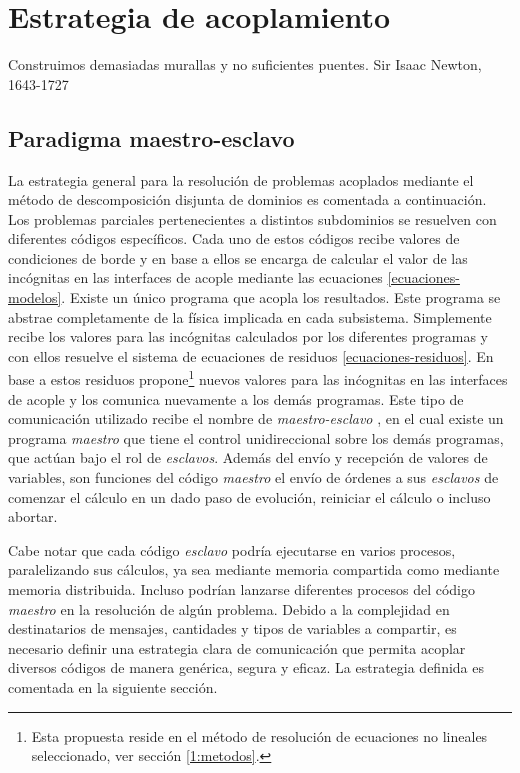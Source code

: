 \chapter{Estrategia de acoplamiento}
\label{chap2}
\chapterquote
{Construimos demasiadas murallas y no suficientes puentes.}
{Sir Isaac Newton, 1643-1727}

\section{Paradigma maestro-esclavo}
\label{2:maestro-esclavo}
La estrategia general para la resolución de problemas acoplados mediante el método de descomposición disjunta de dominios es comentada a continuación.
Los problemas parciales pertenecientes a distintos subdominios se resuelven con diferentes códigos específicos.
Cada uno de estos códigos recibe valores de condiciones de borde y en base a ellos se encarga de calcular el valor de las incógnitas en las interfaces de acople mediante las ecuaciones \ref{ecuaciones-modelos}.
Existe un único programa que acopla los resultados.
Este programa se abstrae completamente de la física implicada en cada subsistema.
Simplemente recibe los valores para las incógnitas calculados por los diferentes programas y con ellos resuelve el sistema de ecuaciones de residuos \ref{ecuaciones-residuos}.
En base a estos residuos propone\footnote{
Esta propuesta reside en el método de resolución de ecuaciones no lineales seleccionado, ver sección \ref{1:metodos}.
} nuevos valores para las inćognitas en las interfaces de acople y los comunica nuevamente a los demás programas.
Este tipo de comunicación utilizado recibe el nombre de \textit{maestro-esclavo} \cite{maestro-esclavo},
en el cual existe un programa \textit{maestro} que tiene el control unidireccional sobre los demás programas, que actúan bajo el rol de \textit{esclavos}.
Además del envío y recepción de valores de variables, son funciones del código \textit{maestro} el envío de órdenes a sus \textit{esclavos} de comenzar el cálculo en un dado paso de evolución, reiniciar el cálculo o incluso abortar.

Cabe notar que cada código \textit{esclavo} podría ejecutarse en varios procesos, paralelizando sus cálculos,
ya sea mediante memoria compartida como mediante memoria distribuida.
Incluso podrían lanzarse diferentes procesos del código \textit{maestro} en la resolución de algún problema.
Debido a la complejidad en destinatarios de mensajes, cantidades y tipos de variables a compartir,
es necesario definir una estrategia clara de comunicación
que permita acoplar diversos códigos de manera genérica, segura y eficaz.
La estrategia definida es comentada en la siguiente sección.

